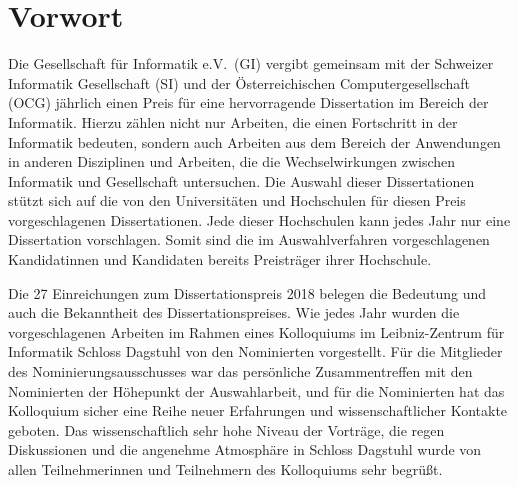 \documentclass{lni}
\begin{document}




\setcounter{page}{3}
\pagestyle{fancy}
\lhead[\fancyplain{}{\small\thepage}]{\fancyplain{}}
\rhead[\fancyplain{}]{\fancyplain{}{\small\thepage}}
\cfoot{}


\section*{Vorwort}

\newcommand{\Zitat}[1]{\glqq#1\grqq}


Die Gesellschaft f{\"u}r Informatik e.V.\ (GI) vergibt gemeinsam mit der Schweizer
Informatik Gesellschaft (SI) und der {\"O}sterreichischen Computergesellschaft (OCG) j{\"a}hrlich einen Preis f{\"u}r eine
hervorragende Dissertation im Bereich der Informatik. Hierzu z{\"a}hlen nicht nur
Arbeiten, die einen Fortschritt in der Informatik bedeuten, sondern auch
Arbeiten aus dem Bereich der Anwendungen in anderen Disziplinen und Arbeiten,
die die Wechselwirkungen zwischen Informatik und Gesellschaft untersuchen. Die
Auswahl dieser Dissertationen st{\"u}tzt sich auf die von den Universit{\"a}ten und
Hochschulen f{\"u}r diesen Preis vorgeschlagenen Dissertationen. Jede dieser
Hochschulen kann jedes Jahr nur eine Dissertation vorschlagen. Somit sind die
im Auswahlverfahren vorgeschlagenen Kandidatinnen und Kandidaten bereits
\Zitat{Preistr{\"a}ger} ihrer Hochschule.

Die 27 Einreichungen zum Dissertationspreis 2018 belegen die
Bedeutung und auch die Bekanntheit des Dissertationspreises. Wie jedes
Jahr wurden die vorgeschlagenen Arbeiten im Rahmen eines Kolloquiums
im Leibniz-Zentrum f{\"u}r Informatik Schloss Dagstuhl von den Nominierten
vorgestellt. F{\"u}r die Mitglieder des Nominierungsausschusses war das
pers{\"o}nliche Zusammentreffen mit den Nominierten der H{\"o}hepunkt der
Auswahlarbeit, und f{\"u}r die Nominierten hat das Kolloquium sicher eine
Reihe neuer Erfahrungen und wissenschaftlicher Kontakte geboten. Das
wissenschaftlich sehr hohe Niveau der Vortr{\"a}ge, die regen Diskussionen
und die angenehme Atmosph{\"a}re in Schloss Dagstuhl wurde von allen
Teilnehmerinnen und Teilnehmern des Kolloquiums sehr begr{\"u}{\ss}t.
\end{document}
